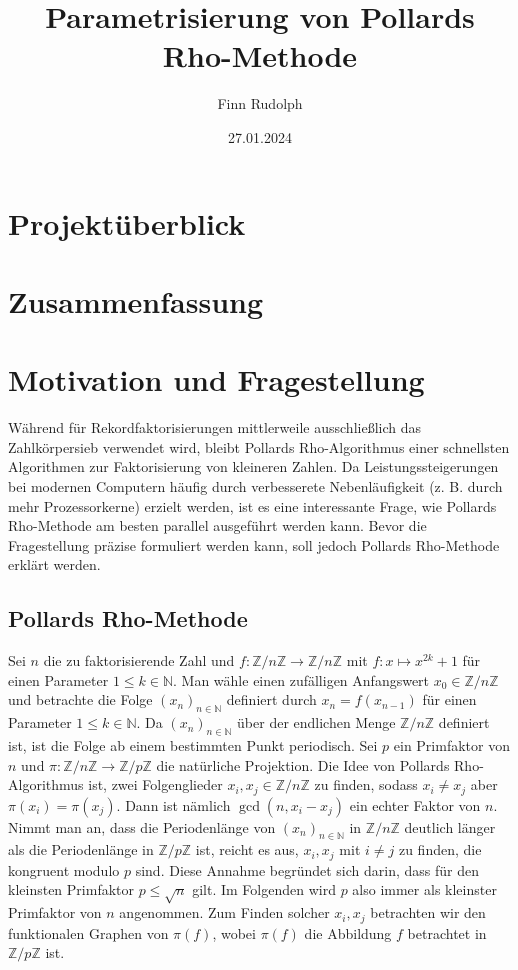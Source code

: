 \documentclass[a4paper, 10pt, ngerman]{article}
\title{\textbf{Parametrisierung von Pollards Rho-Methode}}
\author{Finn Rudolph}
\date{27.01.2024}
\newcommand{\N}{\mathbb{N}}
\newcommand{\Z}{\mathbb{Z}}
\begin{document}
\maketitle

\section*{Projektüberblick}

\tableofcontents

\section{Zusammenfassung}

\section{Motivation und Fragestellung}

Während für Rekordfaktorisierungen mittlerweile ausschließlich das Zahlkörpersieb verwendet wird, bleibt Pollards Rho-Algorithmus einer schnellsten Algorithmen zur Faktorisierung von kleineren Zahlen. Da Leistungssteigerungen bei modernen Computern häufig durch verbesserete Nebenläufigkeit (z. B. durch mehr Prozessorkerne) erzielt werden, ist es eine interessante Frage, wie Pollards Rho-Methode am besten parallel ausgeführt werden kann. Bevor die Fragestellung präzise formuliert werden kann, soll jedoch Pollards Rho-Methode erklärt werden.

\subsection{Pollards Rho-Methode}

Sei $n$ die zu faktorisierende Zahl und $f : \Z/n\Z \to \Z/n\Z$ mit $f : x \mapsto x^{2k} + 1$ für einen Parameter $1 \le k \in \N$. Man wähle einen zufälligen Anfangswert $x_0 \in \Z/n\Z$ und betrachte die Folge $(x_n)_{n \in \N}$ definiert durch $x_n = f(x_{n - 1})$ für einen Parameter $1 \le k \in \N$. Da $(x_n)_{n \in \N}$ über der endlichen Menge $\Z/n\Z$ definiert ist, ist die Folge ab einem bestimmten Punkt periodisch. Sei $p$ ein Primfaktor von $n$ und $\pi : \Z/n\Z \to \Z/p\Z$ die natürliche Projektion. Die Idee von Pollards Rho-Algorithmus ist, zwei Folgenglieder $x_i, x_j \in \Z/n\Z$ zu finden, sodass $x_i \ne x_j$ aber $\pi(x_i) = \pi(x_j)$. Dann ist nämlich $\gcd(n, x_i - x_j)$ ein echter Faktor von $n$. Nimmt man an, dass die Periodenlänge von $(x_n)_{n \in \N}$ in $\Z/n\Z$ deutlich länger als die Periodenlänge in $\Z/p\Z$ ist, reicht es aus, $x_i, x_j$ mit $i \ne j$ zu finden, die kongruent modulo $p$ sind. Diese Annahme begründet sich darin, dass für den kleinsten Primfaktor $p \le \sqrt n$ gilt. Im Folgenden wird $p$ also immer als kleinster Primfaktor von $n$ angenommen. Zum Finden solcher $x_i, x_j$ betrachten wir den funktionalen Graphen von $\pi(f)$, wobei $\pi(f)$ die Abbildung $f$ betrachtet in $\Z/p\Z$ ist.
\end{document}
